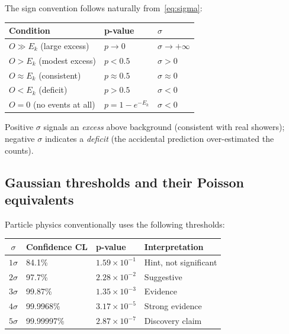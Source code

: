 \documentclass[12pt]{article}
\theoremstyle{definition}
\theoremstyle{remark}
\newcommand{\obs}{O}
\newcommand{\Eacc}{E}
\newcommand{\nsig}{\sigma}
\begin{document}
The sign convention follows naturally from~\eqref{eq:sigma}:

\begin{center}
\renewcommand{\arraystretch}{1.35}
\begin{tabular}{lll}
\toprule
Condition & p-value & $\nsig$ \\
\midrule
$\obs \gg \Eacc_k$ (large excess)   & $p \to 0$   & $\nsig \to +\infty$ \\
$\obs > \Eacc_k$ (modest excess)   & $p < 0.5$   & $\nsig > 0$ \\
$\obs \approx \Eacc_k$ (consistent) & $p \approx 0.5$ & $\nsig \approx 0$ \\
$\obs < \Eacc_k$ (deficit)         & $p > 0.5$   & $\nsig < 0$ \\
$\obs = 0$ (no events at all)       & $p = 1 - e^{-\Eacc_k}$  & $\nsig < 0$ \\
\bottomrule
\end{tabular}
\end{center}

Positive $\nsig$ signals an \emph{excess} above background
(consistent with real showers); negative $\nsig$ indicates a
\emph{deficit} (the accidental prediction over-estimated the counts).

\subsection{Gaussian thresholds and their Poisson equivalents}

Particle physics conventionally uses the following thresholds:

\begin{center}
\renewcommand{\arraystretch}{1.35}
\begin{tabular}{clll}
\toprule
$\nsig$ & Confidence CL & p-value & Interpretation \\
\midrule
$1\sigma$ & 84.1\% & $1.59 \times 10^{-1}$ & Hint, not significant \\
$2\sigma$ & 97.7\% & $2.28 \times 10^{-2}$ & Suggestive \\
$3\sigma$ & 99.87\% & $1.35 \times 10^{-3}$ & Evidence \\
$4\sigma$ & 99.9968\% & $3.17 \times 10^{-5}$ & Strong evidence \\
$5\sigma$ & 99.99997\% & $2.87 \times 10^{-7}$ & Discovery claim \\
\bottomrule
\end{tabular}
\end{center}
\end{document}
